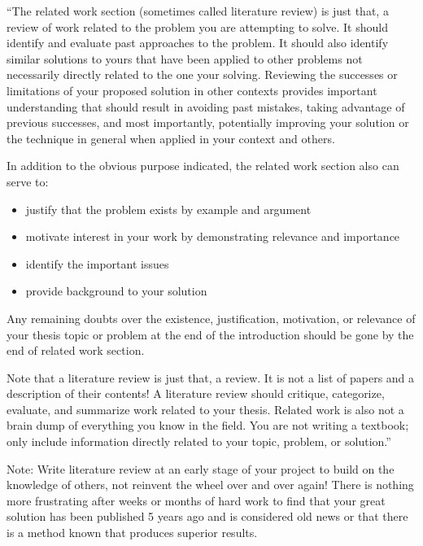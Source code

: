 ``The related work section (sometimes called literature review) is just that, a review of work related to the problem you are attempting to solve. It should identify and evaluate past approaches to the problem. It should also identify similar solutions to yours that have been applied to other problems not necessarily directly related to the one your solving. Reviewing the successes or limitations of your proposed solution in other contexts provides important understanding that should result in avoiding past mistakes, taking advantage of previous successes, and most importantly, potentially improving your solution or the technique in general when applied in your context and others.

In addition to the obvious purpose indicated, the related work section also can serve to:

\begin{itemize}
	\item justify that the problem exists by example and argument
	\item motivate interest in your work by demonstrating relevance and importance
	\item identify the important issues
	\item provide background to your solution
\end{itemize}

Any remaining doubts over the existence, justification, motivation, or relevance of your thesis topic or problem at the end of the introduction should be gone by the end of related work section.

Note that a literature review is just that, a review. It is not a list of papers and a description of their contents! A literature review should critique, categorize, evaluate, and summarize work related to your thesis. Related work is also not a brain dump of everything you know in the field. You are not writing a textbook; only include information directly related to your topic, problem, or solution.''

Note: Write literature review at an early stage of your project to build on the knowledge of others, not reinvent the wheel over and over again! There is nothing more frustrating after weeks or months of hard work to find that your great solution has been published 5 years ago and is considered old news or that there is a method known that produces superior results.

\cite{Robert_24}

\cite{Yassine_22}

\cite{Adam_22}
